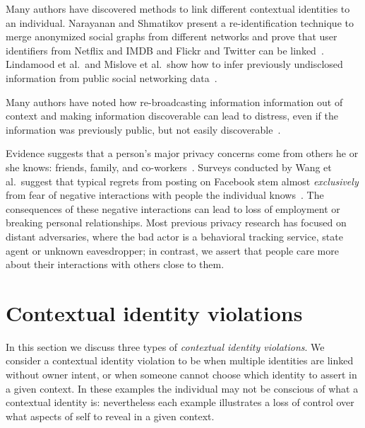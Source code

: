 \documentclass[10pt, conference, compsocconf]{IEEEtran}
\begin{document}
Many authors have discovered methods to link different contextual identities to
an individual. Narayanan and Shmatikov present a re-identification technique
to merge anonymized social graphs from different networks and prove that
user identifiers from Netflix and IMDB and Flickr and Twitter can be
linked~\cite{narayanan1,narayanan2}. Lindamood et al.~and Mislove et al.~show
how to infer previously undisclosed information from public social networking
data~\cite{lindamood,mislove}.

Many authors have noted how re-broadcasting information information out of
context and making information discoverable can lead to distress, even if
the information was previously public, but not easily
discoverable~\cite{boyd1,chew,nissenbaum}.

Evidence suggests that a person's major privacy concerns come from others he or she
knows: friends, family, and co-workers~\cite{fbtips2,fbtips1}.  Surveys
conducted by Wang et al.~suggest that typical regrets from posting on Facebook
stem almost {\em exclusively} from fear of negative interactions with people the individual knows~\cite{wang}. The consequences of these negative interactions can
lead to loss of employment or breaking personal relationships.  Most previous
privacy research has focused on distant adversaries, where the bad actor is a
behavioral tracking service, state agent or unknown eavesdropper; in contrast,
we assert that people care more about their interactions with others close to
them.

\section{Contextual identity violations}
In this section we discuss three types of \textit{contextual identity
violations}. We consider a contextual identity violation to be when multiple
identities are linked without owner intent, or when someone cannot choose which
identity to assert in a given context. In these examples the individual
may not be conscious of what a contextual identity is: nevertheless each
example illustrates a loss of control over what aspects of self to
reveal in a given context.

\label{sec:examples}
\end{document}
